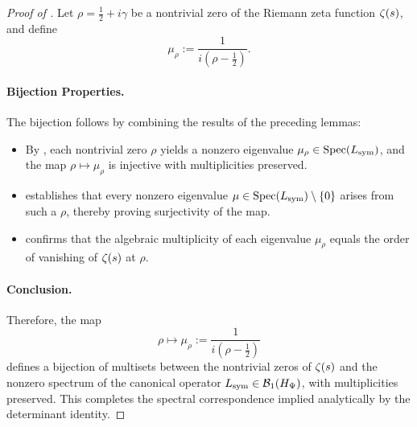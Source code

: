 \begin{proof}[Proof of ]
Let \( \rho = \tfrac{1}{2} + i\gamma \) be a nontrivial zero of the Riemann zeta function \( \zeta(s) \), and define
\[
\mu_\rho := \frac{1}{i(\rho - \tfrac{1}{2})}.
\]

\paragraph{Bijection Properties.}
The bijection follows by combining the results of the preceding lemmas:

\begin{itemize}
  \item By , each nontrivial zero \( \rho \) yields a nonzero eigenvalue \( \mu_\rho \in \operatorname{Spec}(L_{\mathrm{sym}}) \), and the map \( \rho \mapsto \mu_\rho \) is injective with multiplicities preserved.

  \item {} establishes that every nonzero eigenvalue \( \mu \in \operatorname{Spec}(L_{\mathrm{sym}}) \setminus \{0\} \) arises from such a \( \rho \), thereby proving surjectivity of the map.

  \item {} confirms that the algebraic multiplicity of each eigenvalue \( \mu_\rho \) equals the order of vanishing of \( \zeta(s) \) at \( \rho \).
\end{itemize}

\paragraph{Conclusion.}
Therefore, the map
\[
\rho \longmapsto \mu_\rho := \frac{1}{i(\rho - \tfrac{1}{2})}
\]
defines a bijection of multisets between the nontrivial zeros of \( \zeta(s) \) and the nonzero spectrum of the canonical operator \( L_{\mathrm{sym}} \in \mathcal{B}_1(H_{\Psi}) \), with multiplicities preserved. This completes the spectral correspondence implied analytically by the determinant identity.
\end{proof}
